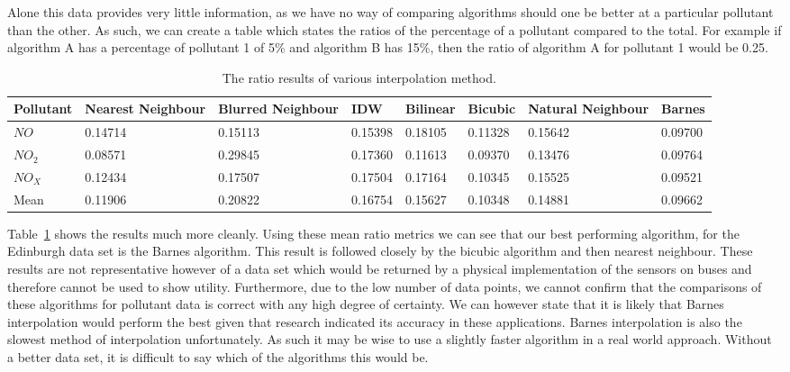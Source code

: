 		Alone this data provides very little information, as we have no way of comparing algorithms should one be better at a particular pollutant than the other. As such, we can create a table which states the ratios of the percentage of a pollutant compared to the total. For example if algorithm A has a percentage of pollutant 1 of 5\% and algorithm B has 15\%, then the ratio of algorithm A for pollutant 1 would be 0.25.

		\begin{table}[H]
			\centering
    		\begin{tabularx}{\linewidth}{|X|X|X|X|X|X|X|X|}
    			\hline
				Pollutant & Nearest Neighbour & Blurred Neighbour & IDW & Bilinear & Bicubic & Natural Neighbour & Barnes \\ \hline
				$NO$ & 0.14714 & 0.15113 & 0.15398 & 0.18105 & 0.11328 & 0.15642 & 0.09700 \\
				$NO_{2}$ & 0.08571 & 0.29845 & 0.17360 & 0.11613 & 0.09370 & 0.13476 & 0.09764\\
				$NO_{X}$ & 0.12434 & 0.17507 & 0.17504 & 0.17164 & 0.10345 & 0.15525 & 0.09521 \\ \hline
				Mean & 0.11906 & 0.20822 & 0.16754 & 0.15627 & 0.10348 & 0.14881 & 0.09662 \\
				\hline
			\end{tabularx}
			\caption{The ratio results of various interpolation method.}
			\label{tab:all_ratio_results}
		\end{table}

		Table~\ref{tab:all_ratio_results} shows the results much more cleanly. Using these mean ratio metrics we can see that our best performing algorithm, for the Edinburgh data set is the Barnes algorithm. This result is followed closely by the bicubic algorithm and then nearest neighbour. These results are not representative however of a data set which would be returned  by a physical implementation of the sensors on buses and therefore cannot be used to show utility. Furthermore, due to the low number of data points, we cannot confirm that the comparisons of these algorithms for pollutant data is correct with any high degree of certainty. We can however state that it is likely that Barnes interpolation would perform the best given that research indicated its accuracy in these applications. Barnes interpolation is also the slowest method of interpolation unfortunately. As such it may be wise to use a slightly faster algorithm in a real world approach. Without a better data set, it is difficult to say which of the algorithms this would be. 
